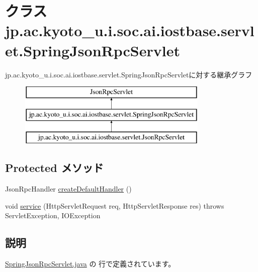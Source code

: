 \hypertarget{classjp_1_1ac_1_1kyoto__u_1_1i_1_1soc_1_1ai_1_1iostbase_1_1servlet_1_1_spring_json_rpc_servlet}{\section{クラス jp.\-ac.\-kyoto\-\_\-u.\-i.\-soc.\-ai.\-iostbase.\-servlet.\-Spring\-Json\-Rpc\-Servlet}
\label{classjp_1_1ac_1_1kyoto__u_1_1i_1_1soc_1_1ai_1_1iostbase_1_1servlet_1_1_spring_json_rpc_servlet}
}
jp.\-ac.\-kyoto\-\_\-u.\-i.\-soc.\-ai.\-iostbase.\-servlet.\-Spring\-Json\-Rpc\-Servletに対する継承グラフ\begin{figure}[H]
\begin{center}
\leavevmode
\includegraphics[height=3.000000cm]{classjp_1_1ac_1_1kyoto__u_1_1i_1_1soc_1_1ai_1_1iostbase_1_1servlet_1_1_spring_json_rpc_servlet}
\end{center}
\end{figure}
\subsection*{Protected メソッド}
\begin{DoxyCompactItemize}
\item 
Json\-Rpc\-Handler \hyperlink{classjp_1_1ac_1_1kyoto__u_1_1i_1_1soc_1_1ai_1_1iostbase_1_1servlet_1_1_spring_json_rpc_servlet_ab618113d6c0b85afff29ccbea8a7efde}{create\-Default\-Handler} ()
\item 
void \hyperlink{classjp_1_1ac_1_1kyoto__u_1_1i_1_1soc_1_1ai_1_1iostbase_1_1servlet_1_1_spring_json_rpc_servlet_a241e28b984c3c6937d5e19dfa83c73f4}{service} (Http\-Servlet\-Request req, Http\-Servlet\-Response res)  throws Servlet\-Exception, I\-O\-Exception 
\end{DoxyCompactItemize}


\subsection{説明}


 \hyperlink{_spring_json_rpc_servlet_8java_source}{Spring\-Json\-Rpc\-Servlet.\-java} の  行で定義されています。



